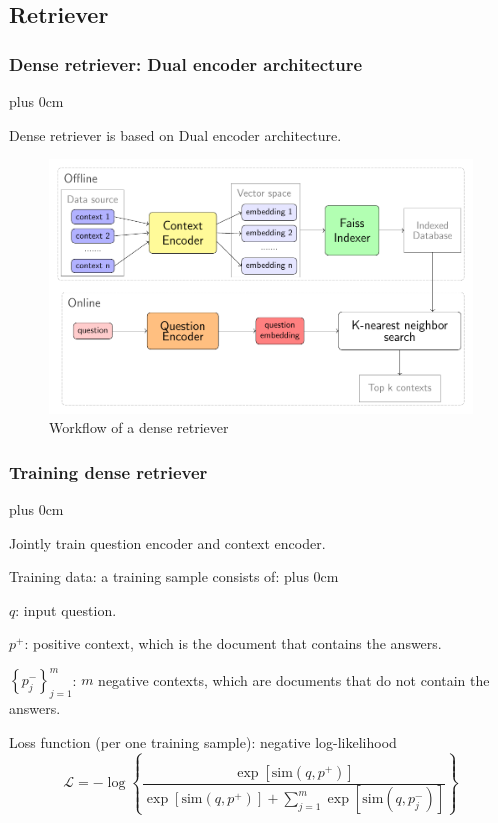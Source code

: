 \documentclass[11pt]{beamer}
\renewcommand{\raggedright}{\leftskip=0pt \rightskip=0pt plus 0cm}
\let\olditemize=\itemize
\renewenvironment{itemize}{\olditemize\raggedright}{\endlist}
\begin{document}
\subsection{Retriever}
\begin{frame}
	\frametitle{Dense retriever: Dual encoder architecture}
	\begin{itemize}
		\item Dense retriever is based on Dual encoder architecture.
	\end{itemize}
	\begin{figure}[h]
		\includegraphics[scale=.57]{images/PDF/biencoder/biencoder.pdf}
		\caption{Workflow of a dense retriever}
	\end{figure}
\end{frame}
\begin{frame}
\frametitle{Training dense retriever}
\begin{itemize}
	\item Jointly train question encoder and context encoder.
	\item Training data: a training sample consists of:
	\begin{itemize}
		\item $q$: input question.
		\item $p^+$: positive context, which is the document that contains the answers.\\[5pt]
		\item $\left\{p^-_j\right\}_{j=1}^m$: $m$ negative contexts, which are documents that do not contain the answers.
	\end{itemize}
	\item Loss function (per one training sample): negative log-likelihood
	\begin{equation}
		\label{eq:01}
		\mathcal{L} = -\log\left\{\dfrac{\exp\left[{\text{sim}\left(q, p^+\right)}\right]}{\exp\left[{\text{sim}\left(q, p^+\right)}\right] + \sum\limits_{j=1}^m \exp\left[{\text{sim}\left(q, p^-_j\right)}\right]}\right\}
	\end{equation}
\end{itemize}
\end{frame}
\end{document}
